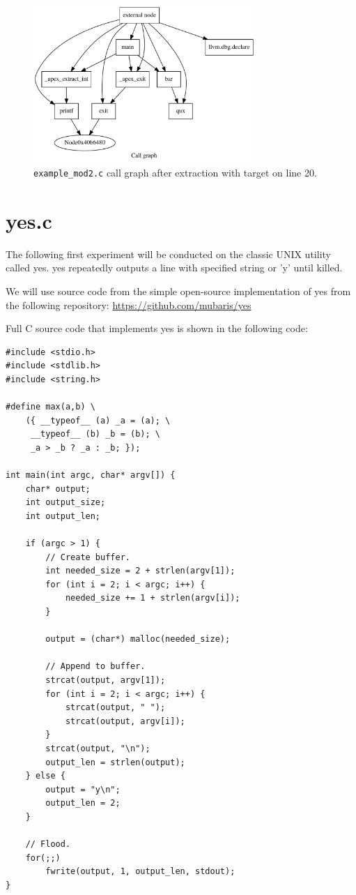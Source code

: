 \documentclass[12pt, twoside]{fithesis2}
\renewcommand{\_}{\leavevmode \kern0.07em\vbox{\hrule width0.4em}}
\begin{document}
\begin{figure}[ht]
    \centering
    \includegraphics[width=0.75\textwidth]{images/experiments/mod2_target20.pdf}
    \caption{
    \texttt{example_mod2.c}
    call graph after extraction with target on line 20.
    }
    \label{fig:exp_img_mod2_target20}
\end{figure}


\section{yes.c}
\label{sec:exp_yes}

The following first experiment will be conducted on the classic UNIX utility
called yes.
yes repeatedly outputs a line with specified string or 'y' until
killed.

We will use source code from the simple open-source implementation of yes
from the following repository: \url{https://github.com/mubaris/yes}

Full C source code that implements yes is shown in the following code:

\begin{verbatim}
#include <stdio.h>
#include <stdlib.h>
#include <string.h>

#define max(a,b) \
    ({ __typeof__ (a) _a = (a); \
     __typeof__ (b) _b = (b); \
     _a > _b ? _a : _b; });

int main(int argc, char* argv[]) {
    char* output;
    int output_size;
    int output_len;

    if (argc > 1) {
        // Create buffer.
        int needed_size = 2 + strlen(argv[1]);
        for (int i = 2; i < argc; i++) {
            needed_size += 1 + strlen(argv[i]);
        }

        output = (char*) malloc(needed_size);

        // Append to buffer.
        strcat(output, argv[1]);
        for (int i = 2; i < argc; i++) {
            strcat(output, " ");
            strcat(output, argv[i]);
        }
        strcat(output, "\n");
        output_len = strlen(output);
    } else {
        output = "y\n";
        output_len = 2;
    }

    // Flood.
    for(;;)
        fwrite(output, 1, output_len, stdout);
}
\end{verbatim}
\end{document}
